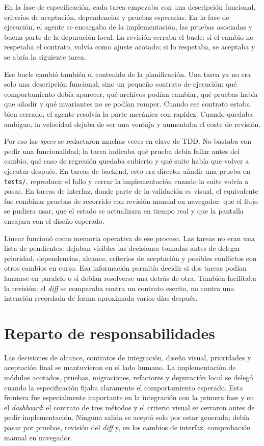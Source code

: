 En la fase de especificación, cada tarea empezaba con una descripción funcional,
criterios de aceptación, dependencias y pruebas esperadas. En la fase de
ejecución, el agente se encargaba de la implementación, las pruebas asociadas y
buena parte de la depuración local. La revisión cerraba el bucle: si el cambio
no respetaba el contrato, volvía como ajuste acotado; si lo respetaba, se
aceptaba y se abría la siguiente tarea.

Ese bucle cambió también el contenido de la planificación. Una tarea ya no era
solo una descripción funcional, sino un pequeño contrato de ejecución: qué
comportamiento debía aparecer, qué archivos podían cambiar, qué pruebas había
que añadir y qué invariantes no se podían romper. Cuando ese contrato estaba
bien cerrado, el agente resolvía la parte mecánica con rapidez. Cuando quedaba
ambiguo, la velocidad dejaba de ser una ventaja y aumentaba el coste de
revisión.

Por eso las \textit{specs} se redactaron muchas veces en clave de TDD. No
bastaba con pedir una funcionalidad; la tarea indicaba qué prueba debía fallar
antes del cambio, qué caso de regresión quedaba cubierto y qué suite había que
volver a ejecutar después. En tareas de backend, esto era directo: añadir una
prueba en \texttt{tests/}, reproducir el fallo y cerrar la implementación cuando
la suite volvía a pasar. En tareas de interfaz, donde parte de la validación es
visual, el equivalente fue combinar pruebas de recorrido con revisión manual en
navegador: que el flujo se pudiera usar, que el estado se actualizara en tiempo
real y que la pantalla encajara con el diseño esperado.

Linear funcionó como memoria operativa de ese proceso. Las tareas no eran una
lista de pendientes: dejaban visibles las decisiones tomadas antes de delegar
prioridad, dependencias, alcance, criterios de
aceptación y posibles conflictos con otros cambios en curso. Esa información
permitía decidir si dos tareas podían lanzarse en paralelo o si debían
resolverse una detrás de otra. También facilitaba la revisión: el
\textit{diff} se comparaba contra un contrato escrito, no contra una intención
recordada de forma aproximada varios días después.

\section{Reparto de responsabilidades}

Las decisiones de alcance, contratos de integración, diseño visual, prioridades y
aceptación final se mantuvieron en el lado humano. La implementación de módulos
acotados, pruebas, migraciones, refactores y depuración local se delegó cuando
la especificación fijaba claramente el comportamiento esperado. Esta frontera
fue especialmente importante en la integración con la primera fase y en el
\textit{dashboard}: el contrato de tres métodos y el criterio visual se cerraron
antes de pedir implementación. Ninguna salida se aceptó solo por estar generada;
debía pasar por pruebas, revisión del \textit{diff} y, en los cambios de
interfaz, comprobación manual en navegador.

